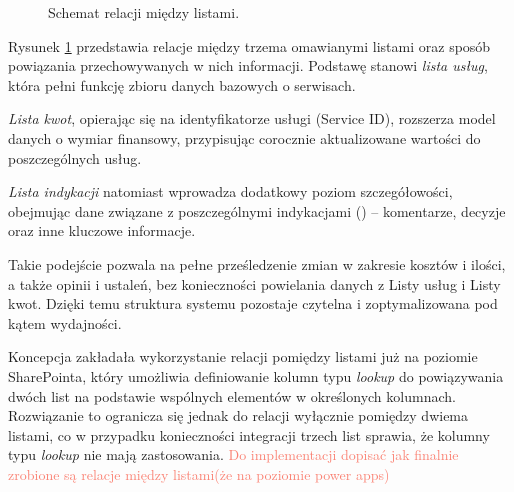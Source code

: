 \begin{figure}[h]
{}
    \caption{Schemat relacji między listami.}
    \label{SchematList}
\end{figure}
  

Rysunek \ref{SchematList} przedstawia relacje między trzema omawianymi listami oraz sposób powiązania przechowywanych w nich informacji. Podstawę stanowi \emph{lista usług}, która pełni funkcję zbioru danych bazowych o serwisach.

\emph{Lista kwot}, opierając się na identyfikatorze usługi (Service ID), rozszerza model danych o wymiar finansowy, przypisując corocznie aktualizowane wartości do poszczególnych usług. 

\emph{Lista indykacji} natomiast wprowadza dodatkowy poziom szczegółowości, obejmując dane związane z poszczególnymi indykacjami () -- komentarze, decyzje oraz inne kluczowe informacje.

Takie podejście pozwala na pełne prześledzenie zmian w zakresie kosztów i ilości, a także opinii i ustaleń, bez konieczności powielania danych z Listy usług i Listy kwot. Dzięki temu struktura systemu pozostaje czytelna i zoptymalizowana pod kątem wydajności.

\vspace{1cm}\par
Koncepcja zakładała wykorzystanie relacji pomiędzy listami już na poziomie SharePointa, który umożliwia definiowanie kolumn typu \emph{lookup} do powiązywania dwóch list na podstawie wspólnych elementów w określonych kolumnach. Rozwiązanie to ogranicza się jednak do relacji wyłącznie pomiędzy dwiema listami, co w przypadku konieczności integracji trzech list sprawia, że kolumny typu \emph{lookup} nie mają zastosowania.
\newline
\textcolor{Salmon}{Do implementacji dopisać jak finalnie zrobione są relacje między listami(że na poziomie power apps)}






